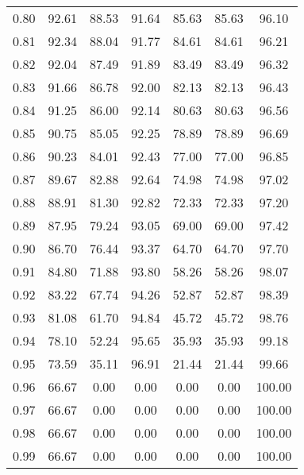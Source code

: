 \begin{tabular}{|c|c|c|c|c|c|c|}
      0.80 &     92.61 &     88.53 &      91.64 &   85.63 &      85.63 &         96.10 \\
      0.81 &     92.34 &     88.04 &      91.77 &   84.61 &      84.61 &         96.21 \\
      0.82 &     92.04 &     87.49 &      91.89 &   83.49 &      83.49 &         96.32 \\
      0.83 &     91.66 &     86.78 &      92.00 &   82.13 &      82.13 &         96.43 \\
      0.84 &     91.25 &     86.00 &      92.14 &   80.63 &      80.63 &         96.56 \\
      0.85 &     90.75 &     85.05 &      92.25 &   78.89 &      78.89 &         96.69 \\
      0.86 &     90.23 &     84.01 &      92.43 &   77.00 &      77.00 &         96.85 \\
      0.87 &     89.67 &     82.88 &      92.64 &   74.98 &      74.98 &         97.02 \\
      0.88 &     88.91 &     81.30 &      92.82 &   72.33 &      72.33 &         97.20 \\
      0.89 &     87.95 &     79.24 &      93.05 &   69.00 &      69.00 &         97.42 \\
      0.90 &     86.70 &     76.44 &      93.37 &   64.70 &      64.70 &         97.70 \\
      0.91 &     84.80 &     71.88 &      93.80 &   58.26 &      58.26 &         98.07 \\
      0.92 &     83.22 &     67.74 &      94.26 &   52.87 &      52.87 &         98.39 \\
      0.93 &     81.08 &     61.70 &      94.84 &   45.72 &      45.72 &         98.76 \\
      0.94 &     78.10 &     52.24 &      95.65 &   35.93 &      35.93 &         99.18 \\
      0.95 &     73.59 &     35.11 &      96.91 &   21.44 &      21.44 &         99.66 \\
      0.96 &     66.67 &      0.00 &       0.00 &    0.00 &       0.00 &        100.00 \\
      0.97 &     66.67 &      0.00 &       0.00 &    0.00 &       0.00 &        100.00 \\
      0.98 &     66.67 &      0.00 &       0.00 &    0.00 &       0.00 &        100.00 \\
      0.99 &     66.67 &      0.00 &       0.00 &    0.00 &       0.00 &        100.00 \\
\bottomrule
\end{tabular}

